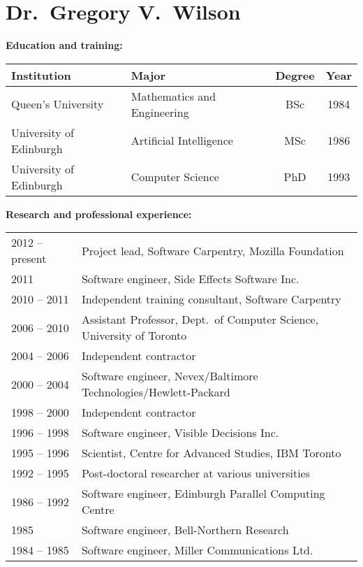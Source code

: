 \documentclass{proposalnsf}
\begin{document}
{}
\renewcommand{\thepage} {\footnotesize Bio.\,---\,\arabic{page}}
\section*{Dr.\ Gregory V.\ Wilson}

\small
\textbf{Education and training:} 

\begin{tabular}{llcc}
Institution & Major & Degree & Year \\ \hline
Queen's University & Mathematics and Engineering & BSc & 1984 \\
University of Edinburgh & Artificial Intelligence & MSc & 1986 \\
University of Edinburgh & Computer Science & PhD & 1993 \\
\end{tabular}

\textbf{Research and professional experience:} 

\begin{tabular}{ll}
2012 -- present &  Project lead, Software Carpentry, Mozilla Foundation \\
2011         &  Software engineer, Side Effects Software Inc. \\
2010 -- 2011 &  Independent training consultant, Software Carpentry \\
2006 -- 2010 &  Assistant Professor, Dept.\ of Computer Science, University of Toronto \\
2004 -- 2006 &  Independent contractor \\
2000 -- 2004 &  Software engineer, Nevex/Baltimore Technologies/Hewlett-Packard \\
1998 -- 2000 &  Independent contractor \\
1996 -- 1998 &  Software engineer, Visible Decisions Inc. \\
1995 -- 1996 &  Scientist, Centre for Advanced Studies, IBM Toronto \\
1992 -- 1995 &  Post-doctoral researcher at various universities \\
1986 -- 1992 &  Software engineer, Edinburgh Parallel Computing Centre \\
1985         &  Software engineer, Bell-Northern Research \\
1984 -- 1985 &  Software engineer, Miller Communications Ltd. \\
\end{tabular}
\end{document}
